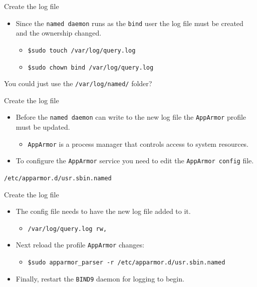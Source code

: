 \documentclass[xcolor=table]{beamer}
\begin{document}
\begin{frame}{Create the log file}
  \begin{itemize}
    \item Since the \texttt{named daemon} runs as the \texttt{bind} user the log file must be created and the ownership changed.
      \begin{itemize}
        \item \texttt{\$sudo touch /var/log/query.log }
        \item \texttt{\$sudo chown bind /var/log/query.log}
      \end{itemize}
  \end{itemize}
  \begin{tcolorbox}[title={\textbf{NOTE:}}]
      \begin{center}
        You could just use the \texttt{/var/log/named/} folder?        
      \end{center}
  \end{tcolorbox}
\end{frame}

\begin{frame}{Create the log file}
  \begin{itemize}
    \item Before the \texttt{named daemon} can write to the new log file the \texttt{AppArmor} profile must be updated.
      \begin{itemize}
        \item \texttt{AppArmor} is a process manager that controls access to system resources.
      \end{itemize}
    \item To configure the \texttt{AppArmor} service you need to edit the \texttt{AppArmor config} file.
  \end{itemize}
  \begin{tcolorbox}
      \begin{center}
        \texttt{/etc/apparmor.d/usr.sbin.named}
      \end{center}
  \end{tcolorbox}
\end{frame}

\begin{frame}{Create the log file}
  \begin{itemize}
    \item The config file needs to have the new log file added to it.
      \begin{itemize}
        \item \texttt{/var/log/query.log rw,}
      \end{itemize}
    \item Next reload the profile \texttt{AppArmor} changes:
      \begin{itemize}
        \item \scriptsize\texttt{\$sudo apparmor\_parser -r /etc/apparmor.d/usr.sbin.named}
      \end{itemize}
    \item Finally, restart the \texttt{BIND9} daemon for logging to begin.
  \end{itemize}
\end{frame}
\end{document}
